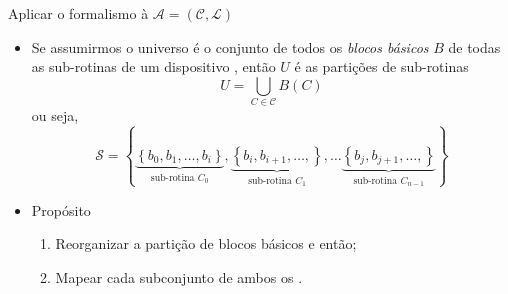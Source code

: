    \begin{frame}{Aplicar o formalismo à $\mathcal{A} = (\mathcal{C}, \mathcal{L})$}
      \begin{itemize}
         \item Se assumirmos o universo é o conjunto de todos os \textit{blocos básicos} $B$ de todas as sub-rotinas de um dispositivo \wearable, então $U$ é as partições de sub-rotinas
         \begin{equation}
            U = \bigcup_{C \in \mathcal{C}} B(C) \label{eq:bigcup}
         \end{equation}
         ou seja,
         \begin{equation}
            \mathcal{S}  = \left \{
            \underbrace{\left \{ b_0, b_1, \dots, b_i \right \}}_{\text{sub-rotina }C_0},
            \underbrace{\left \{ b_i, b_{i+1}, \dots, \right \}}_{\text{sub-rotina }C_1},\dots
            \underbrace{\left \{ b_j, b_{j+1}, \dots, \right \}}_{\text{sub-rotina }C_{n-1}}
            \right \}
         \end{equation}

         \item Propósito
         \begin{enumerate}
            \item Reorganizar a partição de blocos básicos e então;
            \item Mapear cada subconjunto de ambos os \hs.
         \end{enumerate}

      \end{itemize}
   \end{frame}


